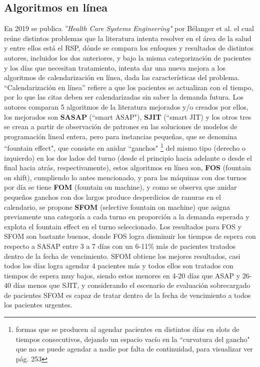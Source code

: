 \documentclass[letter, 10pt]{article}
\begin{document}
    \subsection{Algoritmos en línea}
    En 2019 se publica \textit{''Health Care Systems Engineering"} por Bélanger et al. \cite{trece} el cual reúne distintos problemas que la literatura intenta resolver en el área de la salud y entre ellos está el RSP, dónde se compara los enfoques y resultados de distintos autores, incluidos los dos anteriores, y bajo la misma categorización de pacientes y los días que necesitan tratamiento, intenta dar una nueva mejora a los algoritmos de calendarización en línea, dada las características del problema. “Calendarización en línea” refiere a que los pacientes se actualizan con el tiempo, por lo que las citas deben ser calendarizadas sin saber la demanda futura. Los autores comparan 5 algoritmos de la literatura mejorados y/o creados por ellos, los mejorados son \textbf{SASAP} (``smart ASAP"), \textbf{SJIT} (``smart JIT) y los otros tres  se crean a partir de observación de patrones en las soluciones de modelos de programación lineal entera, pero para instancias pequeñas, que se denomina ``fountain effect", que consiste en anidar ``ganchos" \footnote{formas que se producen al agendar pacientes en distintos días en slots de tiempos consecutivos, dejando un espacio vacío en la ``curvatura del gancho" que no se puede agendar a nadie por falta de continuidad, para visualizar ver \cite{trece} pág. 253} del mismo tipo (derecho o izquierdo) en los dos lados del turno (desde el principio hacia adelante o desde el final hacia atrás, respectivamente), estos algoritmos en línea son, \textbf{FOS} (fountain on shift), cumpliendo lo antes mencionado, y para las máquinas con dos turnos por día se tiene \textbf{FOM} (fountain on machine), y como se observa que anidar pequeños ganchos con dos largos produce desperdicios de ranuras en el calendario, se propone \textbf{SFOM} (selective fountain on machine) que asigna previamente una categoría a cada turno en proporción a la demanda esperada y explota el fountain effect en el turno seleccionado. Los resultados para FOS y SFOM son bastante buenos, donde FOS logra disminuir los tiempos de espera con respecto a SASAP entre 3 a 7 días con un 6-11\% más de pacientes tratados dentro de la fecha de vencimiento. SFOM obtiene los mejores resultados, casi todos los días logra agendar 4 pacientes más y todos ellos son tratados con tiempos de espera muy bajos, siendo estos menores en 4-20 días que ASAP y 26-40 días menos que SJIT, y considerando el escenario de evaluación sobrecargado de pacientes SFOM es capaz de tratar dentro de la fecha de vencimiento a todos los pacientes urgentes.
\end{document}
